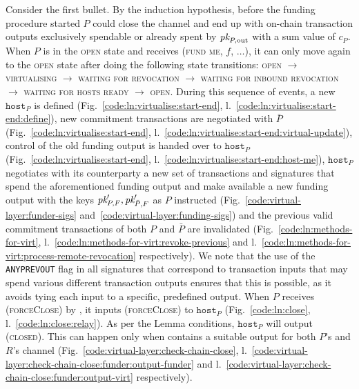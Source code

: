   Consider the first bullet.
  By the induction hypothesis, before the funding procedure started $P$ could
  close the channel and end up with on-chain transaction outputs exclusively
  spendable or already spent by $\textit{pk}_{P, \mathrm{out}}$ with a sum value of
  $c_P$. When $P$ is in the \textsc{open} state and receives (\textsc{fund me},
  $f$, $\dots$), it can only move again to the \textsc{open} state after doing
  the following state transitions: \textsc{open} $\rightarrow$
  \textsc{virtualising} $\rightarrow$ \textsc{waiting for revocation}
  $\rightarrow$ \textsc{waiting for inbound revocation} $\rightarrow$
  \textsc{waiting for hosts ready} $\rightarrow$ \textsc{open}. During this
  sequence of events, a new $\texttt{host}_P$ is defined
  (Fig.~\ref{code:ln:virtualise:start-end},
  l.~\ref{code:ln:virtualise:start-end:define}), new commitment transactions are
  negotiated with $\bar{P}$ (Fig.~\ref{code:ln:virtualise:start-end},
  l.~\ref{code:ln:virtualise:start-end:virtual-update}), control of the old
  funding output is handed over to $\texttt{host}_P$
  (Fig.~\ref{code:ln:virtualise:start-end},
  l.~\ref{code:ln:virtualise:start-end:host-me}), $\texttt{host}_P$ negotiates
  with its counterparty a new set of transactions and signatures that spend the
  aforementioned funding output and make available a new funding output with the
  keys $\textit{pk}_{P, F}', \textit{pk}_{\bar{P}, F}'$ as $P$ instructed
  (Fig.~\ref{code:virtual-layer:funder-sigs}
  and~\ref{code:virtual-layer:funding-sigs}) and the previous valid commitment
  transactions of both $P$ and $\bar{P}$ are invalidated
  (Fig.~\ref{code:ln:methods-for-virt},
  l.~\ref{code:ln:methods-for-virt:revoke-previous} and
  l.~\ref{code:ln:methods-for-virt:process-remote-revocation} respectively). We
  note that the use of the \texttt{ANYPREVOUT} flag in all signatures that
  correspond to transaction inputs that may spend various different transaction
  outputs ensures that this is possible, as it avoids tying each input to a
  specific, predefined output. When $P$ receives (\textsc{forceClose}) by
  \environment, it inputs (\textsc{forceClose}) to $\texttt{host}_P$
  (Fig.~\ref{code:ln:close}, l.~\ref{code:ln:close:relay}). As per the Lemma
  conditions, $\texttt{host}_P$ will output (\textsc{closed}). This can happen
  only when \ledger contains a suitable output for both $P$'s and $R$'s channel
  (Fig.~\ref{code:virtual-layer:check-chain-close},
  l.~\ref{code:virtual-layer:check-chain-close:funder:output-funder} and
  l.~\ref{code:virtual-layer:check-chain-close:funder:output-virt}
  respectively).

